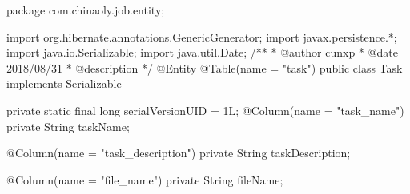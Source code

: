 package com.chinaoly.job.entity;

import org.hibernate.annotations.GenericGenerator;
import javax.persistence.*;
import java.io.Serializable;
import java.util.Date;
/**
* @author cunxp
* @date 2018/08/31
* @description
*/
@Entity
@Table(name = "task")
public class Task implements Serializable {
private static final long serialVersionUID = 1L;
    @Column(name = "task_name")
private String taskName;

    @Column(name = "task_description")
private String taskDescription;

    @Column(name = "file_name")
private String fileName; 

}